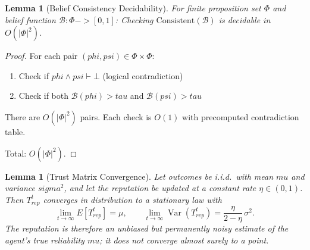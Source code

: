 \documentclass[
]{article}
\newtheorem{lemma}[theorem]{Lemma}
\begin{document}
\begin{lemma}[Belief Consistency Decidability]
\label{lem:consistency-decidable}
For finite proposition set $\Phi$ and belief function $\mathcal{B}: \Phi -> [0,1]$:
Checking $\text{Consistent}(\mathcal{B})$ is decidable in $O(|\Phi|^2)$.
\end{lemma}

\begin{proof}
For each pair $(phi, psi) \in \Phi \times \Phi$:
\begin{enumerate}
\item Check if $phi \land psi \vdash \bot$ (logical contradiction)
\item Check if both $\mathcal{B}(phi) > tau$ and $\mathcal{B}(psi) > tau$
\end{enumerate}

There are $O(|\Phi|^2)$ pairs. Each check is $O(1)$ with precomputed contradiction table.

Total: $O(|\Phi|^2)$.
\end{proof}

\begin{lemma}[Trust Matrix Convergence]
\label{lem:trust-convergence}
Let outcomes be i.i.d.\ with mean $mu$ and variance $sigma^2$, and let the
reputation be updated at a constant rate $\eta \in (0,1)$. Then $T_{rep}^t$
converges \emph{in distribution} to a stationary law with
\begin{equation}
\label{eq:trust-convergence}
\lim_{t \to \infty} E[T_{rep}^t] = \mu,
\qquad
\lim_{t \to \infty} \operatorname{Var}(T_{rep}^t) = \frac{\eta}{2 - \eta}\,\sigma^2 .
\end{equation}
The reputation is therefore an unbiased but permanently noisy estimate of the
agent's true reliability $mu$; it does \emph{not} converge almost surely to a
point.
\end{lemma}
\end{document}
